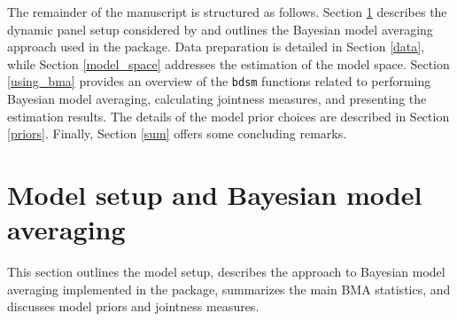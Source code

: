\documentclass[a4paper]{article}
\begin{document}
The remainder of the manuscript is structured as follows.
Section \ref{ms_bma} describes the dynamic panel setup considered by \citet{Moral+2013} and outlines the Bayesian model averaging approach used in the package.
Data preparation is detailed in Section \ref{data}, while Section \ref{model_space} addresses the estimation of the model space.
Section \ref{using_bma} provides an overview of the \verb+bdsm+ functions related to performing Bayesian model averaging, calculating jointness measures, and presenting the estimation results.
The details of the model prior choices are described in Section \ref{priors}.
Finally, Section \ref{sum} offers some concluding remarks.



\section{Model setup and Bayesian model averaging}\label{ms_bma}
This section outlines the model setup, describes the approach to Bayesian model averaging implemented in the package, summarizes the main BMA statistics, and discusses model priors and jointness measures.
\end{document}
